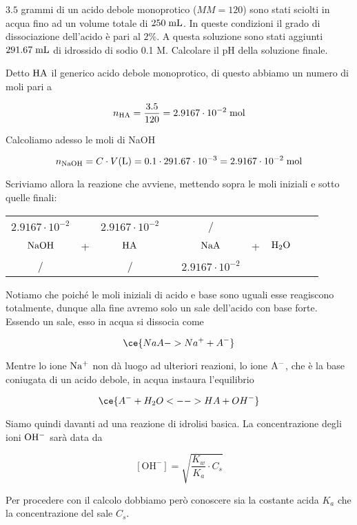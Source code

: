 \newpage

\begin{esercizio}
    $3.5$ grammi di un acido debole monoprotico ($MM=120$) sono stati sciolti in acqua fino ad un volume totale di $250 \; \rm mL$. In queste condizioni il grado di dissociazione dell'acido è pari al $2\%$. A questa soluzione sono stati aggiunti $291.67 \; \rm mL$ di idrossido di sodio 0.1 M. Calcolare il pH della soluzione finale.
\end{esercizio}
\begin{soluzione}
    Detto $\rm HA$ il generico acido debole monoprotico, di questo abbiamo un numero di moli pari a

$$n_{\rm HA}
=\frac{3.5}{120}=2.9167 \cdot 10^{-2} \; \rm mol$$

Calcoliamo adesso le moli di NaOH

$$n_{\rm NaOH}
=C \cdot V(\text{L})=0.1 \cdot 291.67 \cdot 10^{-3}
=2.9167 \cdot 10^{-2} \; \rm mol$$

Scriviamo allora la reazione che avviene, mettendo sopra le moli iniziali e sotto quelle finali:

\begin{center}
    \begin{tabular}{ccccccccc}
        $2.9167 \cdot 10^{-2}$ & & $2.9167 \cdot 10^{-2}$ & & / & &\\
        $\rm NaOH$ & + & $\rm HA$ & \ce{<-->} & $\rm NaA$ & + & $\rm H_2O$\\
        / & & / & & $2.9167 \cdot 10^{-2}$ & &\\
    \end{tabular}
\end{center}

Notiamo che poiché le moli iniziali di acido e base sono uguali esse reagiscono totalmente, dunque alla fine avremo solo un sale dell'acido con base forte. Essendo un sale, esso in acqua si dissocia come

$$\ce{NaA -> Na^+ + A^-}$$

Mentre lo ione $\rm Na^+$ non dà luogo ad ulteriori reazioni, lo ione $\rm A^-$, che è la base coniugata di un acido debole, in acqua instaura l'equilibrio

$$\ce{A^- + H_2O <--> HA + OH^-}$$

Siamo quindi davanti ad una reazione di idrolisi basica. La concentrazione degli ioni $\rm OH^-$ sarà data da

$$[\text{OH}^-]
=\sqrt{\frac{K_w}{K_a}\cdot C_s}$$

Per procedere con il calcolo dobbiamo però conoscere sia la costante acida $K_a$ che la concentrazione del sale $C_s$.


\end{soluzione}
